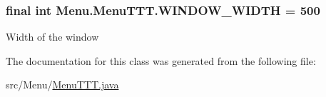 \subsubsection[{W\+I\+N\+D\+O\+W\+\_\+\+W\+I\+D\+T\+H}]{\setlength{\rightskip}{0pt plus 5cm}final int Menu.\+Menu\+T\+T\+T.\+W\+I\+N\+D\+O\+W\+\_\+\+W\+I\+D\+T\+H = 500\hspace{0.3cm}{\ttfamily [private]}}\label{class_menu_1_1_menu_t_t_t_a07f18d5ed40cd020290f7cb16ffadca8}
Width of the window 

The documentation for this class was generated from the following file\+:\begin{DoxyCompactItemize}
\item 
src/\+Menu/\hyperlink{_menu_t_t_t_8java}{Menu\+T\+T\+T.\+java}\end{DoxyCompactItemize}
